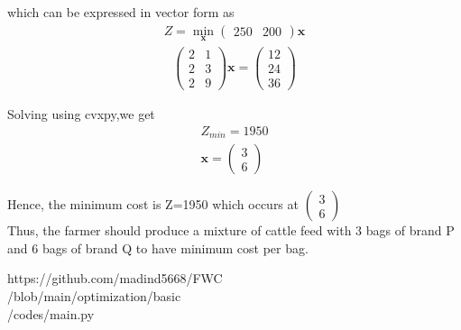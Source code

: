 \documentclass[a4paper,10pt]{report}
\newcommand{\myvec}[1]{\ensuremath{\begin{pmatrix}#1\end{pmatrix}}}
\let\vec\mathbf
\begin{document}
\begin{multicols}{2}
which can be expressed in vector form as
\begin{gather}
	Z = \min_{\vec{x}}\myvec{250 &200}\vec{x}
\end{gather}
\begin{gather}
	\myvec{2&1\\2&3\\2&9}\vec{x}=\myvec{12\\24\\36}
\end{gather}

Solving using cvxpy,we get
\begin{gather}
	Z_{min} = 1950\\
	\vec{x}=\myvec{3\\6}
\end{gather}

Hence, the minimum cost is Z=1950 which occurs at $\myvec{3\\6}$\\
Thus, the farmer should produce a mixture of cattle feed with 3 bags of brand P and 6 bags of brand Q to have minimum cost per bag.\\

\begin{mdframed}
\raggedright\large{https://github.com/madind5668/FWC\\/blob/main/optimization/basic\\/codes/main.py}
\end{mdframed}
\end{multicols}
\end{document}
